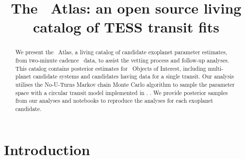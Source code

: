 \documentclass[floatfix,ApJL,twocolumn]{aastex631}
\begin{document}
\title{The \tess\ Atlas: an open source living catalog of TESS transit fits}







\begin{abstract}
We present the \tess\ Atlas, a living catalog of candidate exoplanet parameter estimates, from two-minute cadence \tess\  data, to assist the vetting process and follow-up analyses.
This catalog contains posterior estimates for \red{\numAnalysed} \tess\ Objects of Interest, including \red{\numAnalysedMulti} multi-planet candidate systems and \red{\numAnalysedSingle} candidates having data for a single transit.
Our analysis utilises the No-U-Turns Markov chain Monte Carlo algorithm to sample the parameter space with a circular transit model implemented in \exoplanet.
.
We provide posterior samples from our analyses and \jupyter notebooks to reproduce the analyses for each exoplanet candidate.
\end{abstract}




\section{Introduction} \label{sec:intro}
\end{document}
